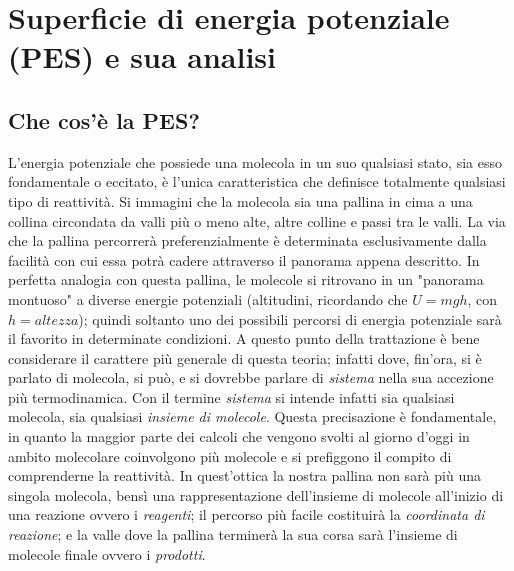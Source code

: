 \documentclass[oneside]{amsbook}
\numberwithin{section}{chapter}
\numberwithin{equation}{section}
\numberwithin{figure}{section}
\begin{document}
\chapter{Superficie di energia potenziale (PES) e sua analisi}
\section{Che cos'è la PES?}
L'energia potenziale che possiede una molecola in un suo qualsiasi stato, sia esso fondamentale o eccitato, è l'unica caratteristica che definisce totalmente qualsiasi tipo di reattività. Si immagini che la molecola sia una pallina in cima a una collina circondata da valli più o meno alte, altre colline e passi tra le valli. La via che la pallina percorrerà preferenzialmente è determinata esclusivamente dalla facilità con cui essa potrà cadere attraverso il panorama appena descritto. In perfetta analogia con questa pallina, le molecole si ritrovano in un "panorama montuoso" a diverse energie potenziali (altitudini, ricordando che $U=mgh$, con $h=altezza$); quindi soltanto uno dei possibili percorsi di energia potenziale sarà il favorito in determinate condizioni. A questo punto della trattazione è bene considerare il carattere più generale di questa teoria; infatti dove, fin'ora, si è parlato di molecola, si può, e si dovrebbe parlare di \emph{sistema} nella sua accezione più termodinamica. 
Con il termine \emph{sistema} si intende infatti sia qualsiasi molecola, sia qualsiasi \emph{insieme di molecole}. Questa precisazione è fondamentale, in quanto la maggior parte dei calcoli che vengono svolti al giorno d'oggi in ambito molecolare coinvolgono più molecole e si prefiggono il compito di comprenderne la reattività. In quest'ottica la nostra pallina non sarà più una singola molecola, bensì una rappresentazione dell'insieme di molecole all'inizio di una reazione ovvero i \emph{reagenti}; il percorso più facile costituirà la \emph{coordinata di reazione}; e la valle dove la pallina terminerà la sua corsa sarà l'insieme di molecole finale ovvero i \emph{prodotti}.
\end{document}
